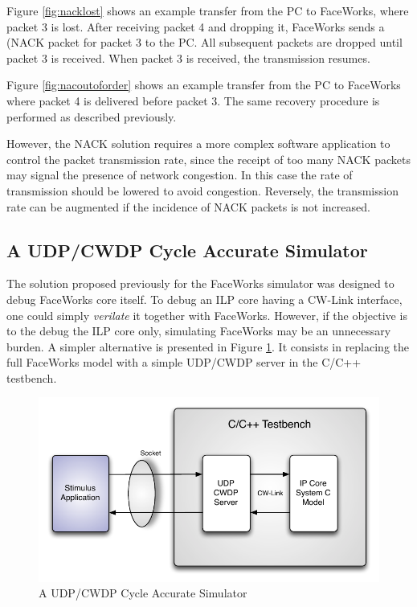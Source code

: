 \documentclass[defaultstyle,10pt,master,Helvetica]{thesis}
\begin{document}
Figure \ref{fig:nacklost} shows an example transfer from the PC to FaceWorks, where packet 3 is lost. After receiving packet 4 and dropping it, FaceWorks sends a (\ac{NACK} packet for packet 3 to the PC. All subsequent packets are dropped until packet 3 is received. When packet 3 is received, the transmission resumes.

Figure \ref{fig:nacoutoforder} shows an example transfer from the PC to FaceWorks where packet 4 is delivered before packet 3. The same recovery procedure is performed as described previously.

However, the NACK solution requires a more complex software application to control the packet transmission rate, since the receipt of too many NACK packets may signal the presence of network congestion. In this case the rate of transmission should be lowered to avoid congestion. Reversely, the transmission rate can be augmented if the incidence of NACK packets is not increased.


\clearpage

\subsection{A UDP/CWDP Cycle Accurate Simulator}

The solution proposed previously for the FaceWorks simulator was designed to debug FaceWorks core itself. To debug an \ac{ILP} core having a CW-Link interface, one could simply {\it verilate} it together with FaceWorks. However, if the objective is to the debug the \ac{ILP} core only, simulating FaceWorks may be an unnecessary burden. A simpler alternative is presented in Figure \ref{fig:udpserver}. It consists in replacing the full FaceWorks model with a simple UDP/CWDP server in the C/C++ testbench.


\begin{figure}[h]
  \centering
      \includegraphics[scale=1,center]{Diagrams/Simp-Diag.pdf}
  \caption{A \ac{UDP}/\ac{CWDP} Cycle Accurate Simulator}\label{fig:udpserver}
\end{figure}
\end{document}
